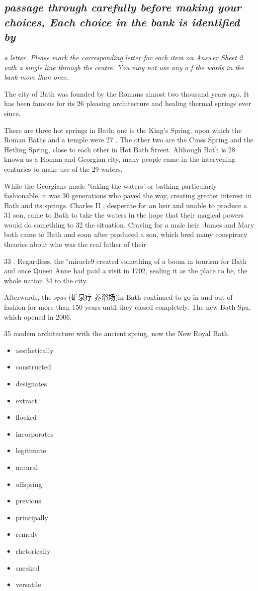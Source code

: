 \documentclass[UTF8,11pt]{ctexart}
\begin{document}
\subsection*{\textit{passage through carefully before making your choices, Each choice in the bank is identified by}}


\textit{a letter. Please mark the corresponding letter for each item on Answer Sheet 2 with a single} \textit{line through the centre. You may not use any o} \textit{f the words in the bank more than once.}


The city of Bath was founded by the Romans almost two thousand years ago. It has been famous for its 26 pleasing architecture and healing thermal springs ever since.


There are three hot springs in Bath; one is the King's Spring, upon which the Roman Baths and a temple were 27 . The other two are the Cross Spring and the Hetling Spring, close to each other in Hot Bath Street. Although Bath is 28 known as a Roman and Georgian city, many people came in the intervening centuries to make use of the 29 waters.


While the Georgians made "taking the waters' or bathing particularly fashionable, it was 30 generations who paved the way, creating greater interest in Bath and its springs. Charles II , desperate for an heir and unable to produce a 31 son, came to Bath to take the waters in the hope that their magical powers would do something to 32 the situation. Craving for a male heir, James and Mary both came to Bath and soon after produced a son, which bred many conspiracy theories about who was the real father of their


33 . Regardless, the "miracle9 created something of a boom in tourism for Bath and once Queen Anne had paid a visit in 1702, sealing it as the place to be, the whole nation 34 to the city.


Afterwards, the \textit{spas} (矿泉疗 养浴场)in Bath continued to go in and out of fashion for more than 150 years until they closed completely. The new Bath Spa, which opened in 2006,


35 modem architecture with the ancient spring, now the New Royal Bath.


\begin{itemize}[leftmargin=2em,itemsep=.2em,topsep=.4em]\item[A.] aesthetically
\item[B.] constructed
\item[C.] designates
\item[D.] extract
\item[E.] flocked
\item[F.] incorporates
\item[G.] legitimate
\item[H.] natural
\item[I.] offspring
\item[J.] previous
\item[K.] principally
\item[L.] remedy
\item[M.] rhetorically
\item[N.] sneaked
\item[O.] versatile
\end{itemize}
\end{document}
